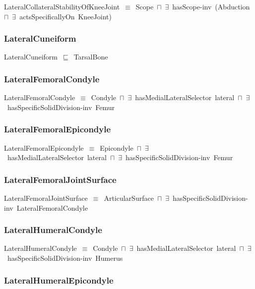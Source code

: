 \documentclass{article}
\begin{document}
LateralCollateralStabilityOfKneeJoint~\ensuremath{\equiv}~Scope~\ensuremath{\sqcap}~\ensuremath{\exists}~hasScope-inv~(Abduction~\ensuremath{\sqcap}~\ensuremath{\exists}~actsSpecificallyOn~KneeJoint)

\subsubsection*{LateralCuneiform}

LateralCuneiform~\ensuremath{\sqsubseteq}~TarsalBone~

\subsubsection*{LateralFemoralCondyle}

LateralFemoralCondyle~\ensuremath{\equiv}~Condyle~\ensuremath{\sqcap}~\ensuremath{\exists}~hasMedialLateralSelector~lateral~\ensuremath{\sqcap}~\ensuremath{\exists}~hasSpecificSolidDivision-inv~Femur

\subsubsection*{LateralFemoralEpicondyle}

LateralFemoralEpicondyle~\ensuremath{\equiv}~Epicondyle~\ensuremath{\sqcap}~\ensuremath{\exists}~hasMedialLateralSelector~lateral~\ensuremath{\sqcap}~\ensuremath{\exists}~hasSpecificSolidDivision-inv~Femur

\subsubsection*{LateralFemoralJointSurface}

LateralFemoralJointSurface~\ensuremath{\equiv}~ArticularSurface~\ensuremath{\sqcap}~\ensuremath{\exists}~hasSpecificSolidDivision-inv~LateralFemoralCondyle

\subsubsection*{LateralHumeralCondyle}

LateralHumeralCondyle~\ensuremath{\equiv}~Condyle~\ensuremath{\sqcap}~\ensuremath{\exists}~hasMedialLateralSelector~lateral~\ensuremath{\sqcap}~\ensuremath{\exists}~hasSpecificSolidDivision-inv~Humerus

\subsubsection*{LateralHumeralEpicondyle}
\end{document}
